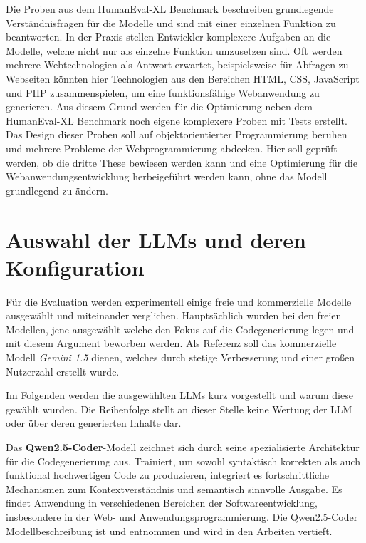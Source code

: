 Die Proben aus dem HumanEval-XL Benchmark beschreiben grundlegende Verständnisfragen für die Modelle und sind mit einer einzelnen Funktion zu beantworten. In der Praxis stellen Entwickler komplexere Aufgaben an die Modelle, welche nicht nur als einzelne Funktion umzusetzen sind. Oft werden mehrere Webtechnologien als Antwort erwartet, beispielsweise für Abfragen zu Webseiten könnten hier Technologien aus den Bereichen HTML, CSS, JavaScript und PHP zusammenspielen, um eine funktionsfähige Webanwendung zu generieren. Aus diesem Grund werden für die Optimierung neben dem HumanEval-XL Benchmark noch eigene komplexere Proben mit Tests erstellt. Das Design dieser Proben soll auf objektorientierter Programmierung beruhen und mehrere Probleme der Webprogrammierung abdecken. Hier soll geprüft werden, ob die dritte These bewiesen werden kann und eine Optimierung für die Webanwendungsentwicklung herbeigeführt werden kann, ohne das Modell grundlegend zu ändern.



\section{Auswahl der LLMs und deren Konfiguration}\label{subsec:llm_selection}

Für die Evaluation werden experimentell einige freie und kommerzielle Modelle ausgewählt und miteinander verglichen. Hauptsächlich wurden bei den freien Modellen, jene ausgewählt welche den Fokus auf die Codegenerierung legen und mit diesem Argument beworben werden. Als Referenz soll das kommerzielle Modell \textit{Gemini 1.5} dienen, welches durch stetige Verbesserung und einer großen Nutzerzahl erstellt wurde.\vspace{0.2cm}

Im Folgenden werden die ausgewählten LLMs kurz vorgestellt und warum diese gewählt wurden. Die Reihenfolge stellt an dieser Stelle keine Wertung der LLM oder über deren generierten Inhalte dar.\vspace{0.2cm}

Das \textbf{Qwen2.5-Coder}-Modell zeichnet sich durch seine spezialisierte Architektur für die Codegenerierung aus. Trainiert, um sowohl syntaktisch korrekten als auch funktional hochwertigen Code zu produzieren, integriert es fortschrittliche Mechanismen zum Kontextverständnis und semantisch sinnvolle Ausgabe. Es findet Anwendung in verschiedenen Bereichen der Softwareentwicklung, insbesondere in der Web- und Anwendungsprogrammierung. Die Qwen2.5-Coder Modellbeschreibung ist \cite{qwen-2024} und \cite{hui-2024} entnommen und wird in den Arbeiten vertieft.\vspace{0.2cm}


